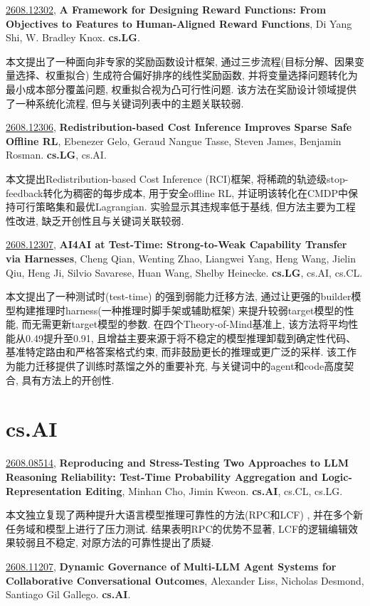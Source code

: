 \documentclass[9pt, a4paper]{article}
\theoremstyle{plain}
\theoremstyle{definition}
\theoremstyle{remark}
\newcommand{\arxivwithtarget}[3]{\hypertarget{#1}{}\href{https://arxiv.org/abs/#1}{#1}, \textbf{\textcolor{arxivblue}{#2}}, #3. }
\begin{document}
\arxivwithtarget{2608.12302}{A Framework for Designing Reward Functions: From Objectives to Features to Human-Aligned Reward Functions}{Di Yang Shi, W. Bradley Knox}\textbf{cs.LG}.

本文提出了一种面向非专家的奖励函数设计框架, 通过三步流程(目标分解、因果变量选择、权重拟合) 生成符合偏好排序的线性奖励函数, 并将变量选择问题转化为最小成本部分覆盖问题, 权重拟合视为凸可行性问题. 该方法在奖励设计领域提供了一种系统化流程, 但与关键词列表中的主题关联较弱.


\arxivwithtarget{2608.12306}{Redistribution-based Cost Inference Improves Sparse Safe Offline RL}{Ebenezer Gelo, Geraud Nangue Tasse, Steven James, Benjamin Rosman}\textbf{cs.LG}, cs.AI.

本文提出Redistribution-based Cost Inference (RCI)框架, 将稀疏的轨迹级stop-feedback转化为稠密的每步成本, 用于安全offline RL, 并证明该转化在CMDP中保持可行策略集和最优Lagrangian. 实验显示其违规率低于基线, 但方法主要为工程性改进, 缺乏开创性且与关键词关联较弱.


\arxivwithtarget{2608.12307}{AI4AI at Test-Time: Strong-to-Weak Capability Transfer via Harnesses}{Cheng Qian, Wenting Zhao, Liangwei Yang, Heng Wang, Jielin Qiu, Heng Ji, Silvio Savarese, Huan Wang, Shelby Heinecke}\textbf{cs.LG}, cs.AI, cs.CL.

本文提出了一种测试时(test-time) 的强到弱能力迁移方法, 通过让更强的builder模型构建推理时harness(一种推理时脚手架或辅助框架) 来提升较弱target模型的性能, 而无需更新target模型的参数. 在四个Theory-of-Mind基准上, 该方法将平均性能从0.49提升至0.91, 且增益主要来源于将不稳定的模型推理卸载到确定性代码、基准特定路由和严格答案格式约束, 而非鼓励更长的推理或更广泛的采样. 该工作为能力迁移提供了训练时蒸馏之外的重要补充, 与关键词中的agent和code高度契合, 具有方法上的开创性.


\section{cs.AI}
\arxivwithtarget{2608.08514}{Reproducing and Stress-Testing Two Approaches to LLM Reasoning Reliability: Test-Time Probability Aggregation and Logic-Representation Editing}{Minhan Cho, Jimin Kweon}\textbf{cs.AI}, cs.CL, cs.LG.

本文独立复现了两种提升大语言模型推理可靠性的方法(RPC和LCF) , 并在多个新任务域和模型上进行了压力测试. 结果表明RPC的优势不显著, LCF的逻辑编辑效果较弱且不稳定, 对原方法的可靠性提出了质疑.


\arxivwithtarget{2608.11207}{Dynamic Governance of Multi-LLM Agent Systems for Collaborative Conversational Outcomes}{Alexander Liss, Nicholas Desmond, Santiago Gil Gallego}\textbf{cs.AI}.
\end{document}
